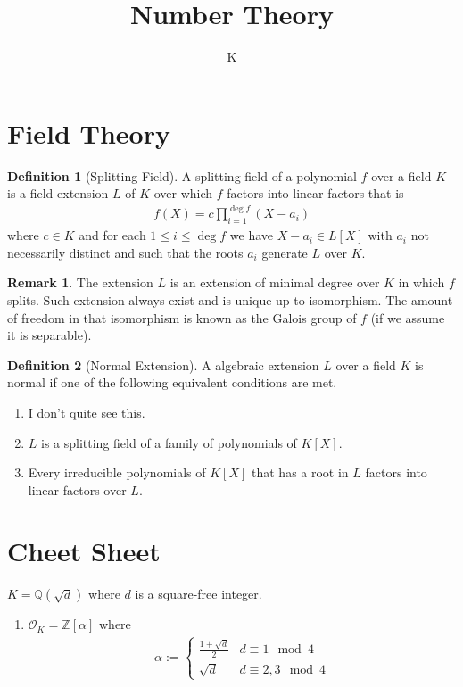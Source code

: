 \documentclass[a4paper]{book}
\title{Number Theory}
\author{K}
\theoremstyle{definition}
\newtheorem{definition}{Definition}[]
\newtheorem*{remark}{Remark}
\begin{document}
\tableofcontents
\part{Field Theory}

\begin{defbox}
    \begin{definition}[Splitting Field]
        A splitting field of a polynomial \(f\) over a field \(K\) is a field extension \(L\) of \(K\) over which \(f\) factors into linear factors that is
        \begin{align*}
            f(X) = c \prod_{i=1}^{\deg f} (X - a_i)
        \end{align*}
        where \(c \in K\) and for each \(1 \leq i \leq \deg f\) we have \(X - a_i \in L[X]\) with \(a_i\) not necessarily distinct and such that the roots \(a_i\) generate \(L\) over \(K\).
    \end{definition}
\end{defbox}
\begin{remark}
    The extension \(L\) is an extension of minimal degree over \(K\) in which \(f\) splits. Such extension always exist and is unique up to isomorphism. The amount of freedom in that isomorphism is known as the Galois group of \(f\) (if we assume it is separable).
\end{remark}

\begin{defbox}
    \begin{definition}[Normal Extension]
        A algebraic extension \(L\) over a field \(K\) is normal if one of the following equivalent conditions are met.
        \begin{enumerate}
            \item I don't quite see this.
            \item \(L\) is a splitting field of a family of polynomials of \(K[X]\).
            \item Every irreducible polynomials of \(K[X]\) that has a root in \(L\) factors into linear factors over \(L\).
        \end{enumerate}
    \end{definition}
\end{defbox}

\part{Cheet Sheet}


\noindent \(K = \mathbb{Q}(\sqrt{d})\) where \(d\) is a square-free integer.
\begin{enumerate}
    \item \(\mathcal{O}_K = \mathbb{Z}[\alpha]\) where
    \begin{align*}
        \alpha := \begin{cases}
            \frac{1 + \sqrt{d}}{2} & d \equiv 1 \mod{4} \\
            \sqrt{d} & d \equiv 2, 3 \mod{4}
        \end{cases}
    \end{align*}
\end{enumerate}
\end{document}
